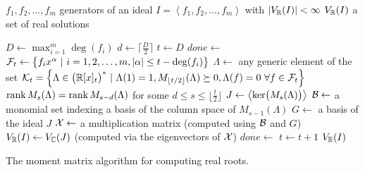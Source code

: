 \begin{algorithm}[ht]
  \begin{algorithmic}[1]
    \Require
      \Statex $f_1, f_2, \ldots, f_m$ generators of an ideal $I = \left<f_1, f_2, \ldots, f_m\right>$ with $|V_{\mathbb{R}}(I)|<\infty$
    \Ensure
      \Statex $V_{\mathbb{R}}(I)$ a set of real solutions
      \Statex

    \State $D \gets \max_{i=1}^m\deg(f_i)$
    \State $d \gets \Big\lceil \frac{D}{2} \Big\rceil$
    \State $t \gets D$
    \State $done \gets$ \False
    \State $\mathcal{F}_t \gets \big\{f_ix^\alpha\ |\ i = 1, 2, \ldots, m, |\alpha|\leq t-\deg(f_i)\big\}$
    \State $\Lambda \gets$ any generic element of the set $\mathcal{K}_t = \Big\{\Lambda\in\big(\mathbb{R}[x]_{t}\big)^*\ |\ \Lambda(1) = 1, M_{\lfloor t/2\rfloor}(\Lambda) \succeq 0, \Lambda(f) = 0 \ \forall f\in\mathcal{F}_t\Big\}$
      \StatexIndent[1]$\operatorname{rank}M_s(\Lambda)=\operatorname{rank} M_{s-d}(\Lambda)$ for some $d \leq s \leq \big\lfloor\frac{t}{2}\big\rfloor$ \algorithmicthen
      \State $J \gets \left<\operatorname{ker}\!\big(M_s(\Lambda)\big)\right>$
      \State $\mathcal{B} \gets$ a monomial set indexing a basis of the column space of $M_{s-1}(\Lambda)$
      \State $G \gets$ a basis of the ideal $J$
      \State $\mathcal{X} \gets$ a multiplication matrix (computed using $\mathcal{B}$ and $G$)
      \State $V_{\mathbb{R}}(I) \gets V_{\mathbb{C}}(J)$ (computed via the eigenvectors of $\mathcal{X}$)
      \State $done \gets$ \True
    \Else
      \State $t \gets t + 1$
    \EndIf
    \EndWhile
    \State \Return $V_{\mathbb{R}}(I)$

  \end{algorithmic}
  \caption{The moment matrix algorithm for computing real roots.}
\end{algorithm}
